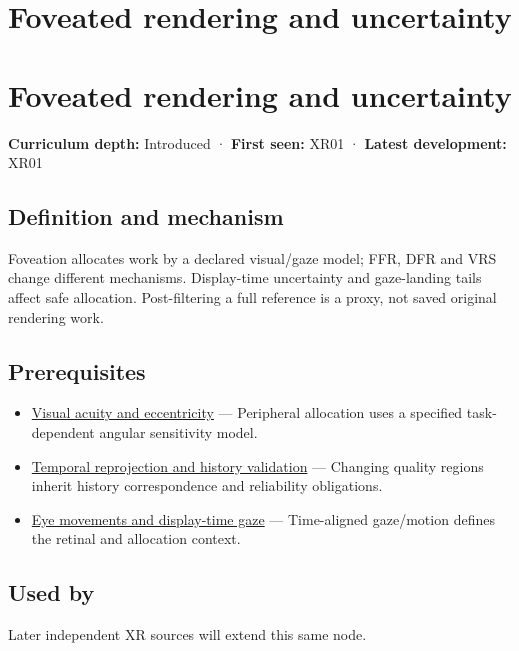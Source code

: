 \hypertarget{appendix-5878b813b732}{}
\section*{Foveated rendering and uncertainty}
\section{Foveated rendering and uncertainty}\label{appendix-5878b813b732-foveated-rendering-and-uncertainty}

\textbf{Curriculum depth:} Introduced · \textbf{First seen:} XR01 · \textbf{Latest development:} XR01

\subsection{Definition and mechanism}\label{appendix-5878b813b732-definition-and-mechanism}

Foveation allocates work by a declared visual/gaze model; FFR, DFR and VRS change different mechanisms. Display-time uncertainty and gaze-landing tails affect safe allocation. Post-filtering a full reference is a proxy, not saved original rendering work.

\subsection{Prerequisites}\label{appendix-5878b813b732-prerequisites}

\begin{itemize}
\tightlist
\item
  \hyperref[appendix-b491fc48c54b]{Visual acuity and eccentricity} --- Peripheral allocation uses a specified task-dependent angular sensitivity model.
\item
  \hyperref[appendix-0727340a4428]{Temporal reprojection and history validation} --- Changing quality regions inherit history correspondence and reliability obligations.
\item
  \hyperref[appendix-a6f2c4fe1996]{Eye movements and display-time gaze} --- Time-aligned gaze/motion defines the retinal and allocation context.
\end{itemize}

\subsection{Used by}\label{appendix-5878b813b732-used-by}

Later independent XR sources will extend this same node.

